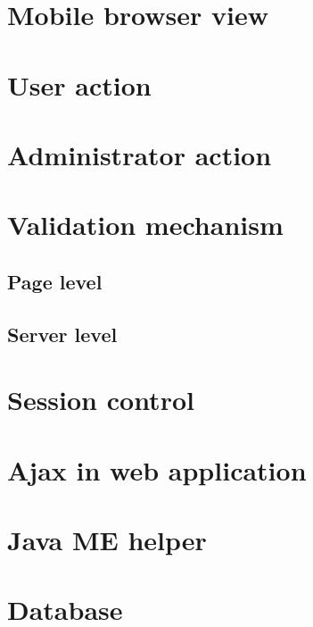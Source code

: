 \section{Mobile browser view}
\label{sec:WebApplication:MobileBrowserView}

\section{User action}
\label{sec:WebApplication:UserAction}

\section{Administrator action}
\label{sec:WebApplication:AdministratorAction}

\section{Validation mechanism}
\label{sec:WebApplication:ValidationMechanism}

\subsection{Page level}
\label{sec:WebApplication:ValidationMechanism:PageLevel}

\subsection{Server level}
\label{sec:WebApplication:ValidationMechanism:ServerLevel}

\section{Session control}
\label{sec:WebApplication:SessionControl}

\section{Ajax in web application}
\label{sec:WebApplication:AjaxInWebApplication}

\section{Java ME helper}
\label{sec:WebApplication:JavaMEHelper}

\section{Database}
\label{sec:WebApplication:Database}

